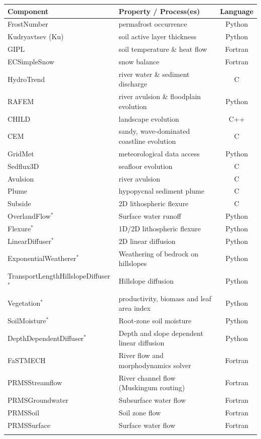 \documentclass{article} %
\begin{document}
\begin{table}[htbp]
    \begin{tabular}{llc}
        \hline
        \textbf{Component} & \textbf{Property / Process(es)} & \textbf{Language} \\
        \hline
        FrostNumber & permafrost occurrence & Python \\
        Kudryavtsev (Ku) & soil active layer thickness & Python \\
        GIPL & soil temperature \& heat flow & Fortran \\
        ECSimpleSnow & snow balance & Fortran \\
        HydroTrend & river water \& sediment discharge & C \\
        RAFEM & river avulsion \& floodplain evolution & Python \\
        CHILD & landscape evolution & C++ \\
        CEM & sandy, wave-dominated coastline evolution & C \\
        GridMet & meteorological data access & Python \\
        Sedflux3D &  seafloor evolution & C \\
        Avulsion & river avulsion & C \\
        Plume & hypopycnal sediment plume& C \\
        Subside & 2D lithospheric flexure & C \\
        OverlandFlow$^*$ & Surface water runoff & Python \\
        Flexure$^*$ & 1D/2D lithospheric flexure & Python \\
        LinearDiffuser$^*$ & 2D linear diffusion & Python \\
        ExponentialWeatherer$^*$ & Weathering of bedrock on hillslopes & Python \\
        TransportLengthHillslopeDiffuser$^*$ & Hillslope diffusion & Python \\
        Vegetation$^*$ & productivity, biomass and leaf area index & Python \\
        SoilMoisture$^*$ & Root-zone soil moisture & Python \\
        DepthDependentDiffuser$^*$ & Depth and slope dependent linear diffusion & Python \\
        FaSTMECH & River flow and morphodynamics solver & Fortran \\
        PRMSStreamflow & River channel flow (Muskingum routing) & Fortran \\
        PRMSGroundwater & Subsurface water flow & Fortran \\
        PRMSSoil & Soil zone flow & Fortran \\
        PRMSSurface & Surface water flow & Fortran \\
        \hline
        \hskip1em (* = Landlab component) & \\
   \end{tabular}
   \label{tab:components}
\end{table}
\end{document}
